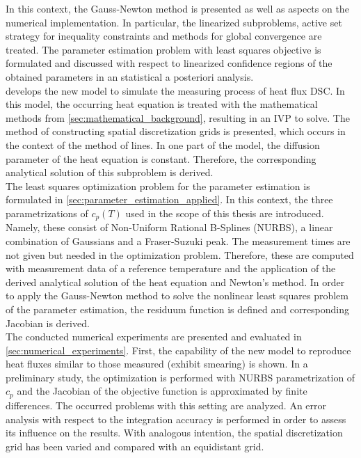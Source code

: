\documentclass{scrartcl}[12pt, halfparskip]
\numberwithin{equation}{section}
\numberwithin{figure}{section}
\numberwithin{table}{section}
\begin{document}
In this context, the Gauss-Newton method is presented as well as aspects on the numerical implementation. 
In particular, the linearized subproblems, active set strategy for inequality constraints and methods for global convergence are treated.
The parameter estimation problem with least squares objective is formulated and discussed with respect to linearized confidence regions of the obtained parameters in an statistical a posteriori analysis. \\
 develops the new model to simulate the measuring process of heat flux DSC. 
In this model, the occurring heat equation is treated with the mathematical methods from \cref{sec:mathematical_background}, resulting in an IVP to solve. 
The method of constructing spatial discretization grids is presented, which occurs in the context of the method of lines. 
In one part of the model, the diffusion parameter of the heat equation is constant. 
Therefore, the corresponding analytical solution of this subproblem is derived. \\
The least squares optimization problem for the parameter estimation is formulated in \cref{sec:parameter_estimation_applied}. 
In this context, the three parametrizations of $c_p(T)$ used in the scope of this thesis are introduced. 
Namely, these consist of Non-Uniform Rational B-Splines (NURBS), a linear combination of Gaussians and a Fraser-Suzuki peak. 
The measurement times are not given but needed in the optimization problem. 
Therefore, these are computed with measurement data of a reference temperature and the application of the derived analytical solution of the heat equation and Newton's method.
In order to apply the Gauss-Newton method to solve the nonlinear least squares problem of the parameter estimation, the residuum function is defined and corresponding Jacobian is derived. \\
The conducted numerical experiments are presented and evaluated in \cref{sec:numerical_experiments}. 
First, the capability of the new model to reproduce heat fluxes similar to those measured (exhibit smearing) is shown. 
In a preliminary study, the optimization is performed with NURBS parametrization of $c_p$ and the Jacobian of the objective function is approximated by finite differences. 
The occurred problems with this setting are analyzed. 
An error analysis with respect to the integration accuracy is performed in order to assess its influence on the results. 
With analogous intention, the spatial discretization grid has been varied and compared with an equidistant grid. 
\end{document}
